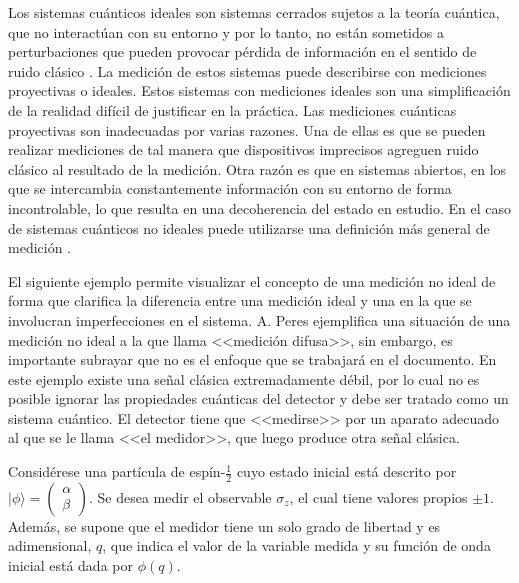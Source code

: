 Los sistemas cuánticos ideales son sistemas cerrados sujetos a la teoría
cuántica, que no interactúan con su entorno y por lo tanto, no están sometidos
a perturbaciones que pueden provocar pérdida de información en el sentido de ruido clásico {\cite{wilde2011classical}}. 
La medición de estos sistemas puede describirse con mediciones
proyectivas o ideales. 
Estos sistemas con mediciones ideales son una
simplificación de la realidad difícil de justificar en la práctica. Las
mediciones cuánticas proyectivas son inadecuadas por varias razones. Una de
ellas es que se pueden realizar mediciones de tal manera que dispositivos
imprecisos agreguen ruido clásico al resultado de la medición. Otra razón es
que 
en sistemas abiertos, en los que se intercambia constantemente información con
su entorno de forma incontrolable, lo que resulta en una decoherencia del
estado en estudio. 
En el caso de sistemas cuánticos no ideales puede utilizarse
una definición más general de medición {\cite{wilde2011classical,
jaeger2007quantum}}.


El siguiente ejemplo permite visualizar el concepto de una medición no ideal de forma que clarifica la diferencia entre una medición ideal y una en la que se involucran imperfecciones en el sistema.
A. Peres {\cite{peres1997quantum}} ejemplifica una situación de una medición no
ideal a la que llama <<medición difusa>>, sin embargo, es importante subrayar
que no es el enfoque que se trabajará en el documento. En este ejemplo existe
una señal clásica extremadamente débil, por lo cual no es posible ignorar las propiedades cuánticas del detector y debe ser tratado como un sistema cuántico. %
 El detector  tiene que <<medirse>> por un aparato adecuado al que se le llama <<el medidor>>, que luego produce otra señal clásica.


Considérese una partícula de espín-$\frac{1}{2}$ cuyo estado inicial está descrito por $|\phi\rangle=\begin{pmatrix}\alpha\\\beta\end{pmatrix}$. Se desea medir el observable $\sigma_z$, el cual tiene valores propios $\pm 1$. Además, se supone que el medidor tiene un solo grado de libertad y es adimensional, $q$, que indica el valor de la variable medida y su función de onda inicial está dada por $\phi(q)$.

